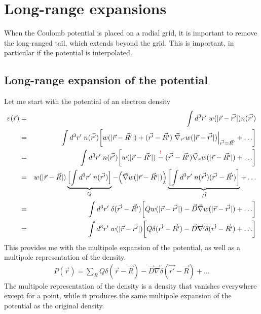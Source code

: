 \documentclass[11pt,a4paper]{report}
\begin{document}
\section{Long-range expansions}
When the Coulomb potential is placed on a radial grid, it is important
to remove the long-ranged tail, which extends beyond the grid.  This
is important, in particular if the potential is interpolated.

\subsection{Long-range expansion of the potential}
Let me start with the potential of an electron density
\begin{eqnarray}
v(\vec{r})&=&
\int d^3r'\; w(|\vec{r}-\vec{r'}|)n(\vec{r'})
\nonumber\\
%
%
&=&\int d^3r'\; n(\vec{r'})
\biggl[
w(|\vec{r}-\vec{R'}|)
+(\vec{r'}-\vec{R'})
\left.\vec{\nabla}_{r'}w(|\vec{r}-\vec{r'}|)
\right|_{\vec{r'}=\vec{R'}}+\ldots\biggr]
\nonumber\\
%
%
&=&\int d^3r'\; n(\vec{r'})
\biggl[
w(|\vec{r}-\vec{R'}|)\stackrel{\textcolor{red}{!}}{-}(\vec{r'}-\vec{R'})
\vec{\nabla}_rw(|\vec{r}-\vec{R'}|)+\ldots\biggr]
\nonumber\\
%
%
&=&
w(|\vec{r}-\vec{R}|)
\underbrace{\Bigl[\int d^3r'\; n(\vec{r'})\Bigr]}_{Q}
-\Bigl(\vec{\nabla}w(|\vec{r}-\vec{R'}|)\Bigr)
\underbrace{
\biggl[\int d^3r'\; n(\vec{r'})(\vec{r'}-\vec{R'})\biggr]
}_{\vec{D}}
+\ldots
\nonumber\\
%
%
&=&
\int d^3r'\; \delta(\vec{r'}-\vec{R'})
\biggl[
Q  w(|\vec{r}-\vec{r'}|)
-\vec{D}\vec{\nabla}w(|\vec{r}-\vec{r'}|)
+\ldots\biggr]
\nonumber\\
%
%
&=&
\int d^3r'\; 
w(|\vec{r}-\vec{r'}|)
\biggl[
Q \delta(\vec{r'}-\vec{R'}) 
-\vec{D}\vec{\nabla'}\delta(\vec{r'}-\vec{R'})
+\ldots\biggr]
\end{eqnarray}
This provides me with the multipole expansion of the potential, as
well as a multipole representation of the density. 
\begin{eqnarray}
P(\vec{r})=\sum_R
Q \delta(\vec{r}-\vec{R}) 
-\vec{D}\vec{\nabla}\delta(\vec{r'}-\vec{R})
+\ldots
\end{eqnarray}
The multipole representation of the density is a density that vanishes
everywhere except for a point, while it produces the same multipole
expansion of the potential as the original density.
\end{document}

